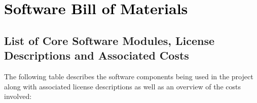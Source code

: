 %
%
%

\chapter{\textcolor{black}{Software Bill of Materials}}

\section{List of Core Software Modules, License Descriptions and Associated Costs}

The following table describes the software components being used in the project along with associated license descriptions as well as an overview of the costs involved:

\setlength{\tabcolsep}{6pt} %
\setlength{\extrarowheight}{2pt} %

\vspace{0.5cm} %

